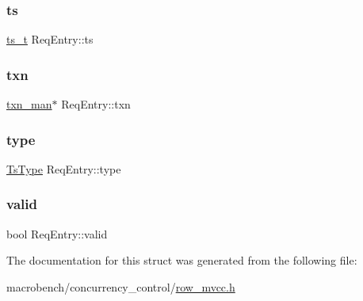 \mbox{\label{structReqEntry_a17beb09e096dd264cbc8d8858ae05b50}} 
\subsubsection{\texorpdfstring{ts}{ts}}
{\footnotesize\ttfamily \hyperlink{global_8h_aaf095dfc9b10f757c968fe146ad7e724}{ts\+\_\+t} Req\+Entry\+::ts}

\mbox{\label{structReqEntry_a5d443d2daf5c317d30d91362d4ac9488}} 
\subsubsection{\texorpdfstring{txn}{txn}}
{\footnotesize\ttfamily \hyperlink{classtxn__man}{txn\+\_\+man}$\ast$ Req\+Entry\+::txn}

\mbox{\label{structReqEntry_a216343c4202bf87fc576c1c4ca196976}} 
\subsubsection{\texorpdfstring{type}{type}}
{\footnotesize\ttfamily \hyperlink{global_8h_a1a7f6ca1462293fe053b5ae74a6c4eda}{Ts\+Type} Req\+Entry\+::type}

\mbox{\label{structReqEntry_adf58ab3907bca28ed97b38a2fb289f5e}} 
\subsubsection{\texorpdfstring{valid}{valid}}
{\footnotesize\ttfamily bool Req\+Entry\+::valid}



The documentation for this struct was generated from the following file\+:\begin{DoxyCompactItemize}
\item 
macrobench/concurrency\+\_\+control/\hyperlink{row__mvcc_8h}{row\+\_\+mvcc.\+h}\end{DoxyCompactItemize}
